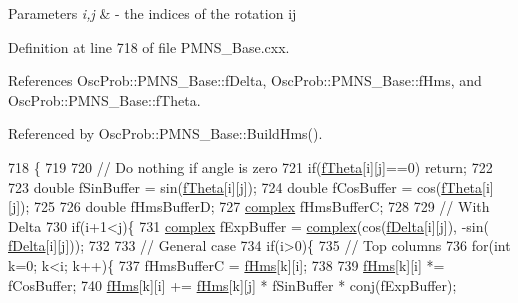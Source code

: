 \begin{DoxyParams}{Parameters}
{\em i,j} & -\/ the indices of the rotation ij \\
\hline
\end{DoxyParams}


Definition at line 718 of file P\+M\+N\+S\+\_\+\+Base.\+cxx.



References Osc\+Prob\+::\+P\+M\+N\+S\+\_\+\+Base\+::f\+Delta, Osc\+Prob\+::\+P\+M\+N\+S\+\_\+\+Base\+::f\+Hms, and Osc\+Prob\+::\+P\+M\+N\+S\+\_\+\+Base\+::f\+Theta.



Referenced by Osc\+Prob\+::\+P\+M\+N\+S\+\_\+\+Base\+::\+Build\+Hms().


\begin{DoxyCode}
718                                   \{
719 
720   \textcolor{comment}{// Do nothing if angle is zero}
721   \textcolor{keywordflow}{if}(\hyperlink{classOscProb_1_1PMNS__Base_a1976887cd658dd86b2336c181f1470b4}{fTheta}[i][j]==0) \textcolor{keywordflow}{return};
722 
723   \textcolor{keywordtype}{double} fSinBuffer = sin(\hyperlink{classOscProb_1_1PMNS__Base_a1976887cd658dd86b2336c181f1470b4}{fTheta}[i][j]);
724   \textcolor{keywordtype}{double} fCosBuffer = cos(\hyperlink{classOscProb_1_1PMNS__Base_a1976887cd658dd86b2336c181f1470b4}{fTheta}[i][j]);
725 
726   \textcolor{keywordtype}{double}  fHmsBufferD;
727   \hyperlink{classOscProb_1_1PMNS__Base_ae86ec4718808ce9d02e5f5b4226714ab}{complex} fHmsBufferC;
728 
729   \textcolor{comment}{// With Delta}
730   \textcolor{keywordflow}{if}(i+1<j)\{
731     \hyperlink{classOscProb_1_1PMNS__Base_ae86ec4718808ce9d02e5f5b4226714ab}{complex} fExpBuffer = \hyperlink{classOscProb_1_1PMNS__Base_ae86ec4718808ce9d02e5f5b4226714ab}{complex}(cos(\hyperlink{classOscProb_1_1PMNS__Base_ab2a5fa40e689b221c8a7d2c17213810d}{fDelta}[i][j]), -sin(
      \hyperlink{classOscProb_1_1PMNS__Base_ab2a5fa40e689b221c8a7d2c17213810d}{fDelta}[i][j]));
732 
733     \textcolor{comment}{// General case}
734     \textcolor{keywordflow}{if}(i>0)\{
735       \textcolor{comment}{// Top columns}
736       \textcolor{keywordflow}{for}(\textcolor{keywordtype}{int} k=0; k<i; k++)\{
737         fHmsBufferC = \hyperlink{classOscProb_1_1PMNS__Base_adf5901166216e8c7a5cff2092952f473}{fHms}[k][i];
738 
739         \hyperlink{classOscProb_1_1PMNS__Base_adf5901166216e8c7a5cff2092952f473}{fHms}[k][i] *= fCosBuffer;
740         \hyperlink{classOscProb_1_1PMNS__Base_adf5901166216e8c7a5cff2092952f473}{fHms}[k][i] += \hyperlink{classOscProb_1_1PMNS__Base_adf5901166216e8c7a5cff2092952f473}{fHms}[k][j] * fSinBuffer * conj(fExpBuffer);

\end{DoxyCode}
